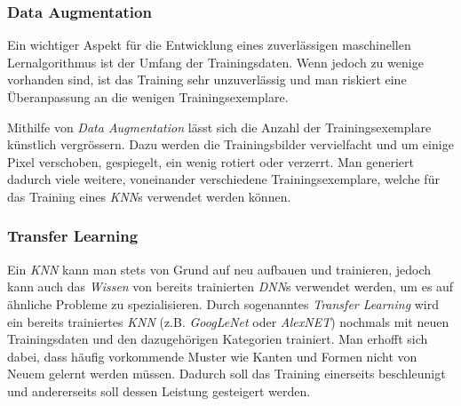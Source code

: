 

\subsubsection{Data Augmentation} \label{cha:theo:mod:da}

Ein wichtiger Aspekt für die Entwicklung eines zuverlässigen maschinellen Lernalgorithmus ist der Umfang der Trainingsdaten. Wenn jedoch zu wenige vorhanden sind, ist das Training sehr unzuverlässig und man riskiert eine Überanpassung an die wenigen Trainingsexemplare.

Mithilfe von \textit{Data Augmentation} lässt sich die Anzahl der Trainingsexemplare künstlich vergrössern. Dazu werden die Trainingsbilder vervielfacht und um einige Pixel verschoben, gespiegelt, ein wenig rotiert oder verzerrt. Man generiert dadurch viele weitere, voneinander verschiedene Trainingsexemplare, welche für das Training eines \textit{KNN}s verwendet werden können.

\subsubsection{Transfer Learning}\label{cha:theo:mod:tl}

Ein \textit{KNN} kann man stets von Grund auf neu aufbauen und trainieren, jedoch kann auch das \textit{Wissen} von bereits trainierten \textit{DNN}s verwendet werden, um es auf ähnliche Probleme zu spezialisieren. Durch sogenanntes \textit{Transfer Learning} wird ein bereits trainiertes \textit{KNN} (z.B. \textit{GoogLeNet} oder \textit{AlexNET}) nochmals mit neuen Trainingsdaten und den dazugehörigen Kategorien trainiert. Man erhofft sich dabei, dass häufig vorkommende Muster wie Kanten und Formen nicht von Neuem gelernt werden müssen. Dadurch soll das Training einerseits beschleunigt und andererseits soll dessen Leistung gesteigert werden.


